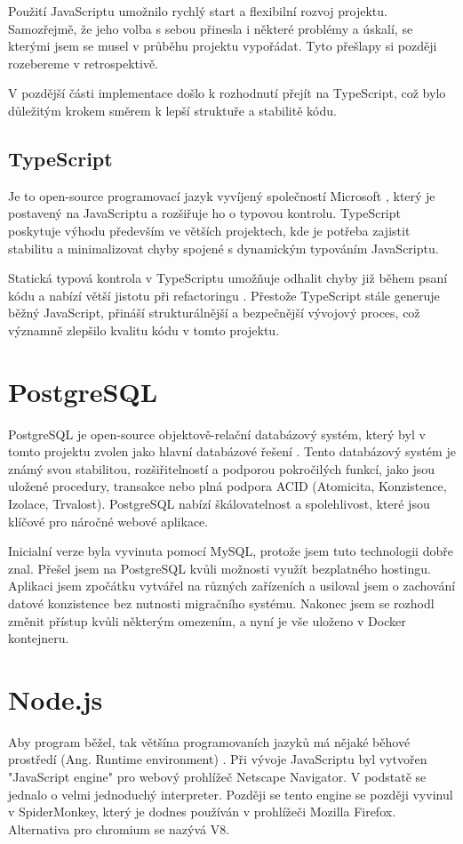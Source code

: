 Použití JavaScriptu umožnilo rychlý start a flexibilní rozvoj projektu. Samozřejmě, že jeho volba s sebou přinesla i některé problémy a úskalí, se kterými jsem se musel v průběhu projektu vypořádat. Tyto přešlapy si později rozebereme v retrospektivě.

V pozdější části implementace došlo k rozhodnutí přejít na TypeScript, což bylo důležitým krokem směrem k lepší struktuře a stabilitě kódu.

\subsection{TypeScript}
Je to open-source programovací jazyk vyvíjený společností Microsoft \cite{typescriptlangDocumentationTypeScript}, který je postavený na JavaScriptu a rozšiřuje ho o typovou kontrolu\cite{goldberg2022learning}. TypeScript poskytuje výhodu především ve větších projektech, kde je potřeba zajistit stabilitu a minimalizovat chyby spojené s dynamickým typováním JavaScriptu.

Statická typová kontrola v TypeScriptu umožňuje odhalit chyby již během psaní kódu a nabízí větší jistotu při refactoringu \cite{enwiki:1258410189}. Přestože TypeScript stále generuje běžný JavaScript, přináší strukturálnější a bezpečnější vývojový proces, což významně zlepšilo kvalitu kódu v tomto projektu.

\section{PostgreSQL}
PostgreSQL je open-source objektově-relační databázový systém, který byl v tomto projektu zvolen jako hlavní databázové řešení \cite{postgresqlPostgreSQL}. Tento databázový systém je známý svou stabilitou, rozšiřitelností a podporou pokročilých funkcí, jako jsou uložené procedury, transakce nebo plná podpora ACID (Atomicita, Konzistence, Izolace, Trvalost). PostgreSQL nabízí škálovatelnost a spolehlivost, které jsou klíčové pro náročné webové aplikace.

Inicialní verze byla vyvinuta pomocí MySQL, protože jsem tuto technologii dobře znal. Přešel jsem na PostgreSQL kvůli možnosti využít bezplatného hostingu. Aplikaci jsem zpočátku vytvářel na různých zařízeních a usiloval jsem o zachování datové konzistence bez nutnosti migračního systému. Nakonec jsem se rozhodl změnit přístup kvůli některým omezením, a nyní je vše uloženo v Docker kontejneru.

\section{Node.js}
Aby program běžel, tak většína programovaních jazyků má nějaké běhové prostředí (Ang. Runtime environment) \cite{enwiki:1245152116}. Při vývoje JavaScriptu byl vytvořen "JavaScript engine" pro webový prohlížeč Netscape Navigator. V podstatě se jednalo o velmi jednoduchý interpreter. Později se tento engine se později vyvinul v SpiderMonkey, který je dodnes používán v prohlížeči Mozilla Firefox\cite{newJavaScriptEngineModuleOwner}. Alternativa pro chromium se nazývá V8.

